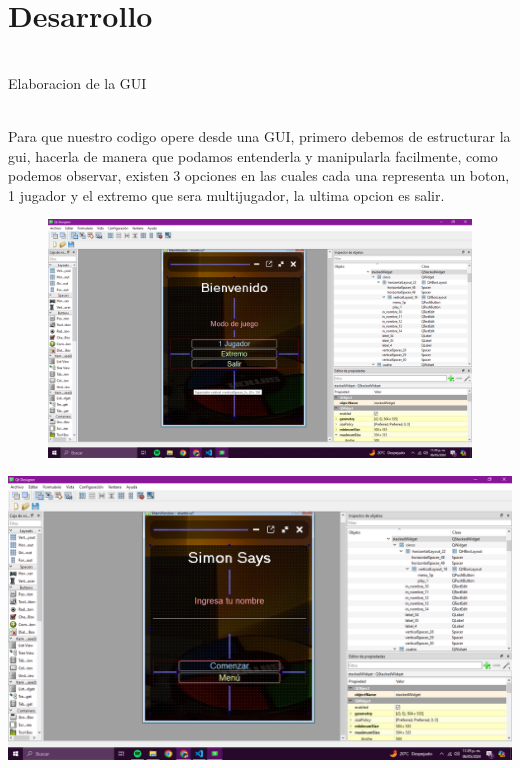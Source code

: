 \documentclass{article}
\begin{document}
\newpage

\section*{\huge Desarrollo}



\vspace{0.2cm}
{\Large 

\\Elaboracion de la GUI


\\Para que nuestro codigo opere desde una GUI, primero debemos de estructurar la gui, hacerla de manera que podamos entenderla y manipularla facilmente, como podemos observar, existen 3 opciones en las cuales cada una representa un boton, 1 jugador y el extremo que sera multijugador, la ultima opcion es salir. 
}
\begin{figure}[h]
    \includegraphics[width=1\textwidth]{Captura de pantalla (754).png} 


\end{figure}

\vspace{.5\baselineskip}




\newpage 
\vspace{0.2cm}
\includegraphics[width=1\linewidth]{Captura de pantalla (755).png}
\end{document}
